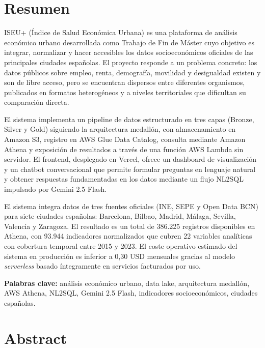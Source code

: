 \chapter*{Resumen}

ISEU+ (Índice de Salud Económica Urbana) es una plataforma de análisis económico urbano desarrollada como Trabajo de Fin de Máster cuyo objetivo es integrar, normalizar y hacer accesibles los datos socioeconómicos oficiales de las principales ciudades españolas. El proyecto responde a un problema concreto: los datos públicos sobre empleo, renta, demografía, movilidad y desigualdad existen y son de libre acceso, pero se encuentran dispersos entre diferentes organismos, publicados en formatos heterogéneos y a niveles territoriales que dificultan su comparación directa.

El sistema implementa un pipeline de datos estructurado en tres capas (Bronze, Silver y Gold) siguiendo la arquitectura medallón, con almacenamiento en Amazon S3, registro en AWS Glue Data Catalog, consulta mediante Amazon Athena y exposición de resultados a través de una función AWS Lambda sin servidor. El frontend, desplegado en Vercel, ofrece un dashboard de visualización y un chatbot conversacional que permite formular preguntas en lenguaje natural y obtener respuestas fundamentadas en los datos mediante un flujo NL2SQL impulsado por Gemini 2.5 Flash.

El sistema integra datos de tres fuentes oficiales (INE, SEPE y Open Data BCN) para siete ciudades españolas: Barcelona, Bilbao, Madrid, Málaga, Sevilla, Valencia y Zaragoza. El resultado es un total de 386.225 registros disponibles en Athena, con 93.944 indicadores normalizados que cubren 22 variables analíticas con cobertura temporal entre 2015 y 2023. El coste operativo estimado del sistema en producción es inferior a 0{,}30 USD mensuales gracias al modelo \textit{serverless} basado íntegramente en servicios facturados por uso.

\textbf{Palabras clave:} análisis económico urbano, data lake, arquitectura medallón, AWS Athena, NL2SQL, Gemini 2.5 Flash, indicadores socioeconómicos, ciudades españolas.

\vspace{1.5em}

\chapter*{Abstract}

